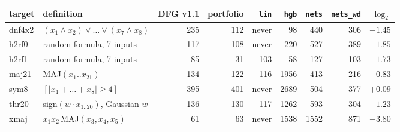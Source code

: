 \begin{tabular}{llrrrrrrr}
\toprule
target & definition & DFG v1.1 & portfolio & \texttt{lin} & \texttt{hgb} & \texttt{nets} & \texttt{nets\_wd} & $\log_2$\\
\midrule
dnf4x2 & $(x_1\wedge x_2)\vee\dots\vee(x_7\wedge x_8)$ & 235 & 112 & never & 98 & 440 & 306 & $-1.45$\\
h2rf0 & random formula, 7 inputs & 117 & 108 & never & 220 & 527 & 389 & $-1.85$\\
h2rf1 & random formula, 7 inputs & 85 & 31 & 103 & 58 & 127 & 103 & $-1.73$\\
maj21 & MAJ$(x_1..x_{21})$ & 134 & 122 & 116 & 1956 & 413 & 216 & $-0.83$\\
sym8 & $[|x_1+\dots+x_8|\ge4]$ & 395 & 401 & never & 2689 & 504 & 377 & $+0.09$\\
thr20 & sign$(w\cdot x_{1..20})$, Gaussian $w$ & 136 & 130 & 117 & 1262 & 593 & 304 & $-1.23$\\
xmaj & $x_1x_2\,$MAJ$(x_3,x_4,x_5)$ & 61 & 63 & never & 1538 & 1552 & 871 & $-3.80$\\
\bottomrule
\end{tabular}
